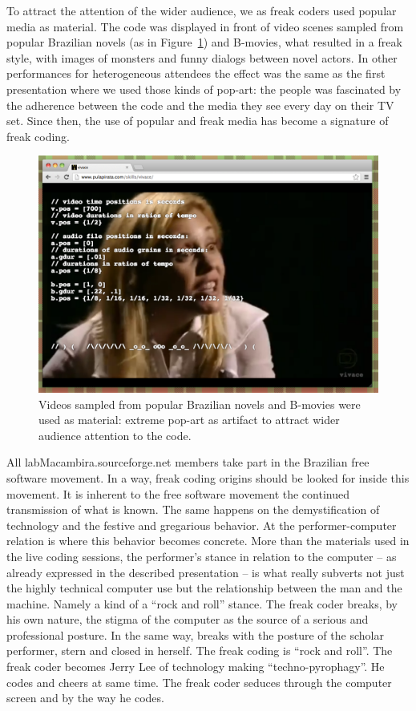 \documentclass[letterpaper, 12pt]{article}
\begin{document}
{To attract the attention of the wider audience, we as freak coders
used popular media as material. The code was displayed in front of
video scenes sampled from popular Brazilian novels (as in
Figure~\ref{fig:novela}) and B-movies, what resulted in a freak style,
with images of monsters and funny dialogs between novel actors. In
other performances for heterogeneous attendees the effect was the same
as the first presentation where we used those kinds of pop-art: the
people was fascinated by the adherence between the code and the media
they see every day on their TV set. Since then, the use of popular and
freak media has become a signature of freak coding.

\begin{figure}[htpb]
  \begin{center}
    \includegraphics[scale=.3]{img/fig_novela.png}
    \caption{Videos sampled from popular Brazilian novels and B-movies
      were used as material: extreme pop-art as artifact to attract
      wider audience attention to the code.}
    \label{fig:novela}
  \end{center}
\end{figure}

All labMacambira.sourceforge.net members take part in the Brazilian
free software movement. In a way, freak coding origins should be
looked for inside this movement. It is inherent to the free software
movement the continued transmission of what is known. The same happens
on the demystification of technology and the festive and gregarious
behavior. At the performer-computer relation is where this behavior
becomes concrete. More than the materials used in the live coding
sessions, the performer's stance in relation to the computer -- as
already expressed in the described presentation -- is what really
subverts not just the highly technical computer use but the
relationship between the man and the machine. Namely a kind of a
``rock and roll'' stance. The freak coder breaks, by his own nature,
the stigma of the computer as the source of a serious and professional
posture. In the same way, breaks with the posture of the scholar
performer, stern and closed in herself. The freak coding is ``rock and
roll''. The freak coder becomes Jerry Lee of technology making
``techno-pyrophagy''. He codes and cheers at same time. The freak
coder seduces through the computer screen and by the way he codes.

}
\end{document}
